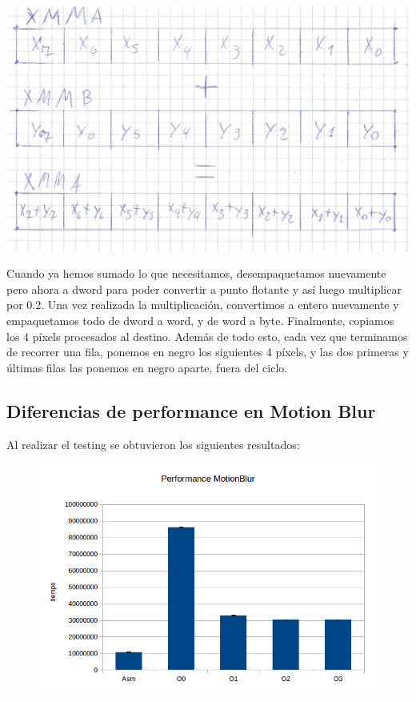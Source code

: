 \documentclass[a4paper]{article}
\begin{document}
\begin{center}
\includegraphics[scale=0.66]{Dibujos/sv.jpg}
\end{center}

Cuando ya hemos sumado lo que necesitamos, desempaquetamos nuevamente pero ahora a dword para poder convertir a punto flotante y así luego multiplicar por $0.2$. Una vez realizada la multiplicación, convertimos a entero nuevamente y empaquetamos todo de dword a word, y de word a byte. Finalmente, copiamos los 4 píxels procesados al destino. Además de todo esto, cada vez que terminamos de recorrer una fila, ponemos en negro los siguientes 4 píxels, y las dos primeras y últimas filas las ponemos en negro aparte, fuera del ciclo.

\subsection{Diferencias de performance en Motion Blur}

Al realizar el testing se obtuvieron los siguientes resultados:

\newpage

\begin{figure}[h!]
  \begin{center}
  \includegraphics[scale=0.66]{Graficos1.4/mbl/per.jpg}
  \label{nombreparareferenciar11}
  \end{center}
\end{figure}
\end{document}
